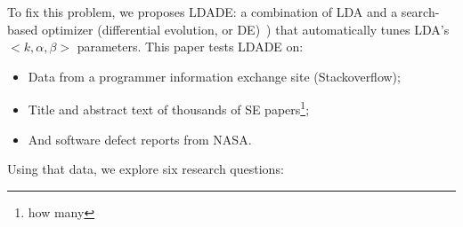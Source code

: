 \documentclass[10pt,conference]{IEEEtran}
\newcommand{\bi}{\begin{itemize}}
\newcommand{\ei}{\end{itemize}}
\theoremstyle{break}
\begin{document}
To fix this problem,
we proposes LDADE: a  combination of LDA and a search-based optimizer (differential evolution, or DE)~\cite{storn1997differential})
that automatically tunes LDA's \mbox{$<k,\alpha,\beta>$} parameters. This paper tests LDADE on:
\bi
\item Data from a programmer information exchange site (Stackoverflow);
  \item Title and abstract text of
    thousands of SE papers\footnote{how many};
  \item And software defect reports from NASA.
    \ei
    Using that data, we explore six research questions:  
\end{document}
